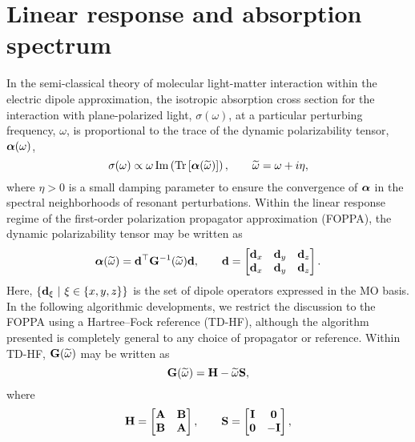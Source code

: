 \section{Linear response and absorption spectrum}
\label{sec:lras}

In the semi-classical theory of molecular light-matter interaction within the electric dipole approximation, the isotropic absorption cross section for the interaction with plane-polarized light, $\sigma(\omega)$, at a particular perturbing frequency, $\omega$, is proportional to the trace of the dynamic polarizability tensor, $\boldsymbol{\alpha}(\omega)$,
\begin{equation}
  \sigma(\omega) \propto \omega \operatorname{Im}\left(\operatorname{Tr}\left[ \boldsymbol{\alpha}(\widetilde{\omega}) \right]\right), \qquad \widetilde{\omega} = \omega + i\eta,
  \label{eq:abs-spectrum}
\end{equation}
where $\eta > 0$ is a small damping parameter to ensure the convergence of $\boldsymbol{\alpha}$ in the spectral neighborhoods of resonant perturbations. Within the linear response regime of the first-order polarization propagator approximation (FOPPA)\cite{Yeager84_33}, the dynamic polarizability tensor may be written as
\begin{equation}
  \boldsymbol{\alpha}(\widetilde{\omega}) = \mathbf{d}^\top \mathbf{G}^{-1}(\widetilde{\omega}) \mathbf{d}, \qquad 
  \mathbf{d} = \begin{bmatrix}
    \mathbf{d}_x & \mathbf{d}_y & \mathbf{d}_z \\
    \mathbf{d}_x & \mathbf{d}_y & \mathbf{d}_z
  \end{bmatrix}.
  \label{eq:polar-tensor}
\end{equation}
Here, $\{ \mathbf{d}_\xi\text{ } \vert\text{ } \xi \in \{ x,y,z \} \}$ is the set of
dipole operators expressed in the MO basis.
In the following algorithmic developments, we restrict the discussion to the FOPPA using a
Hartree--Fock reference (TD-HF), although the algorithm presented is completely
general to any choice of propagator or reference. Within TD-HF, $\mathbf{G}(\widetilde{\omega})$
may be written as
\begin{equation}
  \mathbf{G}(\widetilde{\omega}) = \mathbf{H} - \widetilde{\omega}\mathbf{S},
  \label{eq:defG}
\end{equation}
where
\begin{equation}
  \bH = \begin{bmatrix}
    \bA & \bB \\
    \bB & \bA
  \end{bmatrix}, \qquad
  \bS = \begin{bmatrix*}
    \bI & \vc 0 \\
    \vc 0 & -\bI
  \end{bmatrix*},
  \label{eq:defH}
\end{equation}
